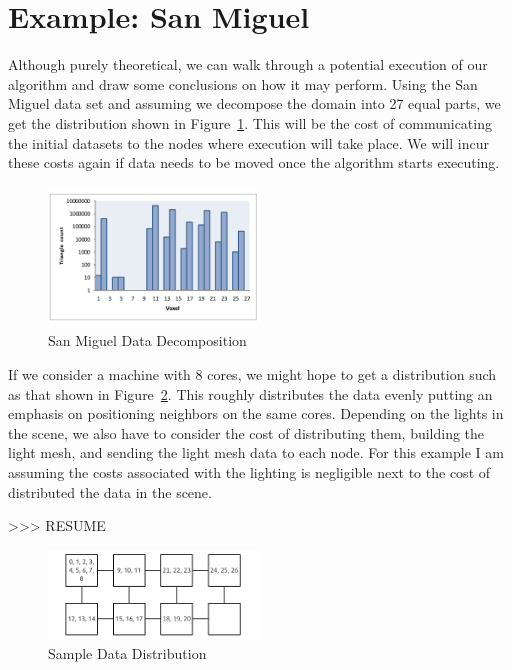 \section{Example: San Miguel}
\label{sec:example}

Although purely theoretical, we can walk through a potential execution
of our algorithm and draw some conclusions on how it may perform.
Using the San Miguel data set
and assuming we decompose the domain into 27 equal parts, we get the
distribution shown in Figure~\ref{fig:decomposition}. This will be the
cost of communicating the initial datasets to the nodes where
execution will take place. We will incur these costs again if data
needs to be moved once the algorithm starts executing.

\begin{figure}[!htb]
  \centering
  \includegraphics[width=0.5\textwidth]{drawings/DataDistribution.pdf}
  \caption{San Miguel Data Decomposition}
  \label{fig:decomposition}
\end{figure}

If we consider a machine with 8 cores, we might hope to get a distribution such as that shown in Figure~\ref{fig:machines}.   This roughly distributes the data evenly putting an emphasis on positioning neighbors on the same cores.  Depending on the lights in the scene, we also have to consider the cost of distributing them, building the light mesh, and sending the light mesh data to each node.  For this example I am assuming the costs associated with the lighting is negligible next to the cost of distributed the data in the scene. 

>>> RESUME

\begin{figure}[!htb]
  \centering
  \includegraphics[width=0.5\textwidth]{drawings/NodeDistribution.pdf}
  \caption{Sample Data Distribution}
  \label{fig:machines}
\end{figure} 

